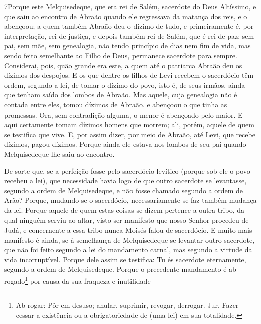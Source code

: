 \lettrine{7} Porque este Melquisedeque, que era rei de Salém,
sacerdote do Deus Altíssimo, e que saiu ao encontro de Abraão quando
ele regressava da matança dos reis, e o abençoou; a quem também
Abraão deu o dízimo de tudo, e primeiramente é, por interpretação,
rei de justiça, e depois também rei de Salém, que é rei de paz;
sem pai, sem mãe, sem genealogia, não tendo princípio de dias
nem fim de vida, mas sendo feito semelhante ao Filho de Deus,
permanece sacerdote para sempre. Considerai, pois, quão grande
era este, a quem até o patriarca Abraão deu os dízimos dos despojos.
E os que dentre os filhos de Levi recebem o sacerdócio têm
ordem, segundo a lei, de tomar o dízimo do povo, isto é, de seus
irmãos, ainda que tenham saído dos lombos de Abraão. Mas aquele,
cuja genealogia não é contada entre eles, tomou dízimos de Abraão, e
abençoou o que tinha as promessas. Ora, sem contradição alguma,
o menor é abençoado pelo maior. E aqui certamente tomam dízimos
homens que morrem; ali, porém, aquele de quem se testifica que vive.
E, por assim dizer, por meio de Abraão, até Levi, que recebe
dízimos, pagou dízimos. Porque ainda ele estava nos lombos de
seu pai quando Melquisedeque lhe saiu ao encontro.

De sorte que, se a perfeição fosse pelo sacerdócio levítico
(porque sob ele o povo recebeu a lei), que necessidade havia logo de
que outro sacerdote se levantasse, segundo a ordem de Melquisedeque,
e não fosse chamado segundo a ordem de Arão? Porque,
mudando-se o sacerdócio, necessariamente se faz também mudança da
lei. Porque aquele de quem estas coisas se dizem pertence a
outra tribo, da qual ninguém serviu ao altar, visto ser
manifesto que nosso Senhor procedeu de Judá, e concernente a essa
tribo nunca Moisés falou de sacerdócio. E muito mais
manifesto é ainda, se à semelhança de Melquisedeque se levantar
outro sacerdote, que não foi feito segundo a lei do
mandamento carnal, mas segundo a virtude da vida incorruptível.
Porque dele assim se testifica: Tu és sacerdote eternamente,
segundo a ordem de Melquisedeque. Porque o precedente
mandamento é ab-rogado\footnote{Ab-rogar: Pôr em desuso; anular,
suprimir, revogar, derrogar. Jur. Fazer cessar a existência ou a
obrigatoriedade de (uma lei) em sua totalidade.} por causa da sua
fraqueza e inutilidade

